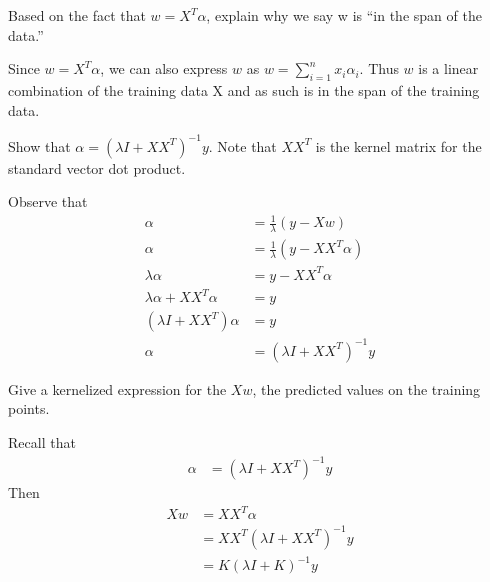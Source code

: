 \documentclass[12pt,letterpaper]{article}
\begin{document}
\begin{problem}{3.3}
    Based on the fact that $w=X^{T}\alpha$, explain why we say w is ``in
    the span of the data.''
\end{problem}
\begin{solution}{}
    Since $w=X^T\alpha$, we can also express $w$ as $w = \sum_{i=1}^n x_i \alpha_i$. Thus $w$ is a linear combination
    of the training data X and as such is in the span of the training data.
\end{solution}
\newpage

\begin{problem}{3.4}
    Show that $\alpha=(\lambda I+XX^{T})^{-1}y$. Note that $XX^{T}$
    is the kernel matrix for the standard vector dot product.
\end{problem}
\begin{solution}{}
    Observe that
    \begin{align*}
        \alpha &= \frac{1}{\lambda}(y-Xw)\\
        \alpha &= \frac{1}{\lambda}(y-XX^T\alpha)\\
        \lambda \alpha &= y-XX^T\alpha\\
        \lambda \alpha + XX^T\alpha &= y\\
        (\lambda I + XX^T)\alpha &= y\\
        \alpha &= (\lambda I + XX^T)^{-1}y
    \end{align*}
\end{solution}
\newpage

\begin{problem}{3.5}
    Give a kernelized expression for the $Xw$, the predicted values on
    the training points.
\end{problem}
\begin{solution}{}
    Recall that
    \begin{align*}
        \alpha &= (\lambda I + XX^T)^{-1}y
    \end{align*}
    Then
    \begin{align*}
        Xw &= XX^T\alpha\\
        &= XX^T(\lambda I + XX^T)^{-1}y \\
        &= K(\lambda I + K)^{-1}y
    \end{align*}
\end{solution}
\newpage
\end{document}

